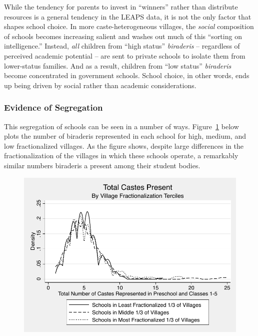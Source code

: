 \documentclass[Eubank_pk_ethnic_sorting.tex]{subfiles}
\begin{document}
While the tendency for parents to invest in ``winners'' rather than distribute resources is a general tendency in the LEAPS data, it is not the only factor that shapes school choice.  In more caste-heterogeneous villages, the \emph{social} composition of schools becomes increasing salient and washes out much of this ``sorting on intelligence.'' Instead, \emph{all} children from ``high status'' \emph{biraderis} -- regardless of perceived academic potential -- are sent to private schools to isolate them from lower-status families. And as a result, children from ``low status'' \emph{biraderis} become concentrated in government schools. School choice, in other words, ends up being driven by social rather than academic considerations. 

\subsubsection{Evidence of Segregation}

This segregation of schools can be seen in a number of ways. Figure~\ref{numcastes} below plots the number of biraderis represented in each school for high, medium, and low fractionalized villages. As the figure shows, despite large differences in the fractionalization of the villages in which these schools operate, a remarkably similar numbers biraderis a present among their student bodies.

\begin{figure}[H]
	\begin{center}
	\caption{}\label{numcastes}
	\includegraphics[scale=1.0]{../graphs/totalpresent.pdf}
	\end{center}
\end{figure}
\end{document}
